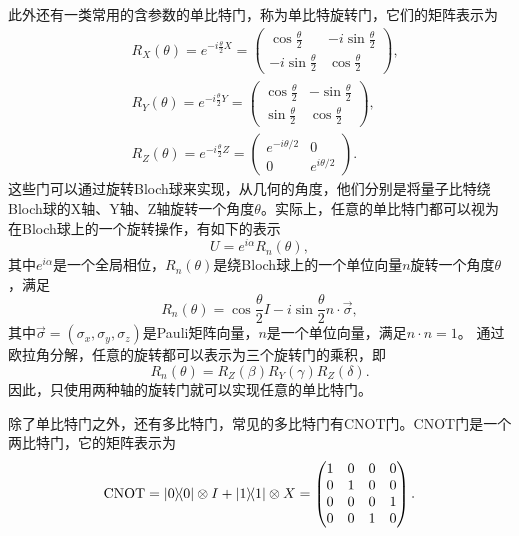 此外还有一类常用的含参数的单比特门，称为单比特旋转门，它们的矩阵表示为
\begin{equation}
    \begin{aligned}
        &R_X(\theta) =e^{-i\frac{\theta}{2}X} = \begin{pmatrix} \cos\frac{\theta}{2} & -i\sin\frac{\theta}{2} \\ -i\sin\frac{\theta}{2} & \cos\frac{\theta}{2} \end{pmatrix}, \\ &R_Y(\theta)=e^{-i\frac{\theta}{2}Y} = \begin{pmatrix} \cos\frac{\theta}{2} & -\sin\frac{\theta}{2} \\ \sin\frac{\theta}{2} & \cos\frac{\theta}{2} \end{pmatrix},\\ &R_Z(\theta)=e^{-i\frac{\theta}{2}Z} = \begin{pmatrix} e^{-i\theta/2} & 0 \\ 0 & e^{i\theta/2} \end{pmatrix}.
    \end{aligned}
\end{equation}
这些门可以通过旋转Bloch球来实现，从几何的角度，他们分别是将量子比特绕Bloch球的X轴、Y轴、Z轴旋转一个角度$\theta$。实际上，任意的单比特门都可以视为在Bloch球上的一个旋转操作，有如下的表示
\begin{equation}
    U = e^{i\alpha}R_n(\theta),
\end{equation}
其中$e^{i\alpha}$是一个全局相位，$R_n(\theta)$是绕Bloch球上的一个单位向量$n$旋转一个角度$\theta$，满足
\begin{equation}
    R_n(\theta) = \cos\frac{\theta}{2}I - i\sin\frac{\theta}{2}n\cdot\vec{\sigma},
\end{equation}
其中$\vec{\sigma} = (\sigma_x, \sigma_y, \sigma_z)$是Pauli矩阵向量，$n$是一个单位向量，满足$n\cdot n = 1$。
通过欧拉角分解，任意的旋转都可以表示为三个旋转门的乘积，即
\begin{equation}
    R_n(\theta) = R_Z(\beta)R_Y(\gamma)R_Z(\delta).
\end{equation}
因此，只使用两种轴的旋转门就可以实现任意的单比特门。

除了单比特门之外，还有多比特门，常见的多比特门有CNOT门。CNOT门是一个两比特门，它的矩阵表示为
\begin{equation}
    \text{CNOT} = \ketbra{0}{0}\otimes I + \ketbra{1}{1}\otimes X=\begin{pmatrix} 1 & 0 & 0 & 0 \\ 0 & 1 & 0 & 0 \\ 0 & 0 & 0 & 1 \\ 0 & 0 & 1 & 0 \end{pmatrix}.
\end{equation}

